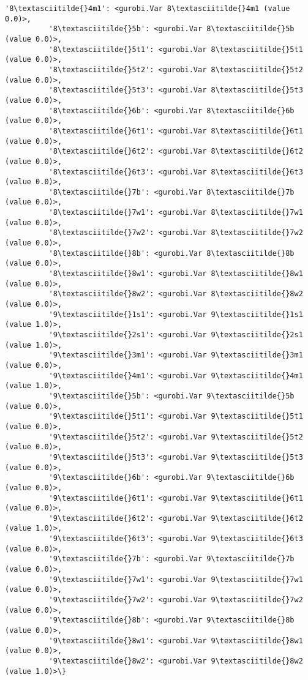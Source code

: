 \documentclass[11pt]{article}
\begin{document}
\begin{Verbatim}[commandchars=\\\{\}]
          '8\textasciitilde{}4m1': <gurobi.Var 8\textasciitilde{}4m1 (value 0.0)>,
          '8\textasciitilde{}5b': <gurobi.Var 8\textasciitilde{}5b (value 0.0)>,
          '8\textasciitilde{}5t1': <gurobi.Var 8\textasciitilde{}5t1 (value 0.0)>,
          '8\textasciitilde{}5t2': <gurobi.Var 8\textasciitilde{}5t2 (value 0.0)>,
          '8\textasciitilde{}5t3': <gurobi.Var 8\textasciitilde{}5t3 (value 0.0)>,
          '8\textasciitilde{}6b': <gurobi.Var 8\textasciitilde{}6b (value 0.0)>,
          '8\textasciitilde{}6t1': <gurobi.Var 8\textasciitilde{}6t1 (value 0.0)>,
          '8\textasciitilde{}6t2': <gurobi.Var 8\textasciitilde{}6t2 (value 0.0)>,
          '8\textasciitilde{}6t3': <gurobi.Var 8\textasciitilde{}6t3 (value 0.0)>,
          '8\textasciitilde{}7b': <gurobi.Var 8\textasciitilde{}7b (value 0.0)>,
          '8\textasciitilde{}7w1': <gurobi.Var 8\textasciitilde{}7w1 (value 0.0)>,
          '8\textasciitilde{}7w2': <gurobi.Var 8\textasciitilde{}7w2 (value 0.0)>,
          '8\textasciitilde{}8b': <gurobi.Var 8\textasciitilde{}8b (value 0.0)>,
          '8\textasciitilde{}8w1': <gurobi.Var 8\textasciitilde{}8w1 (value 0.0)>,
          '8\textasciitilde{}8w2': <gurobi.Var 8\textasciitilde{}8w2 (value 0.0)>,
          '9\textasciitilde{}1s1': <gurobi.Var 9\textasciitilde{}1s1 (value 1.0)>,
          '9\textasciitilde{}2s1': <gurobi.Var 9\textasciitilde{}2s1 (value 1.0)>,
          '9\textasciitilde{}3m1': <gurobi.Var 9\textasciitilde{}3m1 (value 0.0)>,
          '9\textasciitilde{}4m1': <gurobi.Var 9\textasciitilde{}4m1 (value 1.0)>,
          '9\textasciitilde{}5b': <gurobi.Var 9\textasciitilde{}5b (value 0.0)>,
          '9\textasciitilde{}5t1': <gurobi.Var 9\textasciitilde{}5t1 (value 0.0)>,
          '9\textasciitilde{}5t2': <gurobi.Var 9\textasciitilde{}5t2 (value 0.0)>,
          '9\textasciitilde{}5t3': <gurobi.Var 9\textasciitilde{}5t3 (value 0.0)>,
          '9\textasciitilde{}6b': <gurobi.Var 9\textasciitilde{}6b (value 0.0)>,
          '9\textasciitilde{}6t1': <gurobi.Var 9\textasciitilde{}6t1 (value 0.0)>,
          '9\textasciitilde{}6t2': <gurobi.Var 9\textasciitilde{}6t2 (value 1.0)>,
          '9\textasciitilde{}6t3': <gurobi.Var 9\textasciitilde{}6t3 (value 0.0)>,
          '9\textasciitilde{}7b': <gurobi.Var 9\textasciitilde{}7b (value 0.0)>,
          '9\textasciitilde{}7w1': <gurobi.Var 9\textasciitilde{}7w1 (value 0.0)>,
          '9\textasciitilde{}7w2': <gurobi.Var 9\textasciitilde{}7w2 (value 0.0)>,
          '9\textasciitilde{}8b': <gurobi.Var 9\textasciitilde{}8b (value 0.0)>,
          '9\textasciitilde{}8w1': <gurobi.Var 9\textasciitilde{}8w1 (value 0.0)>,
          '9\textasciitilde{}8w2': <gurobi.Var 9\textasciitilde{}8w2 (value 1.0)>\}
\end{Verbatim}
        

    
    
    
    
\end{document}
